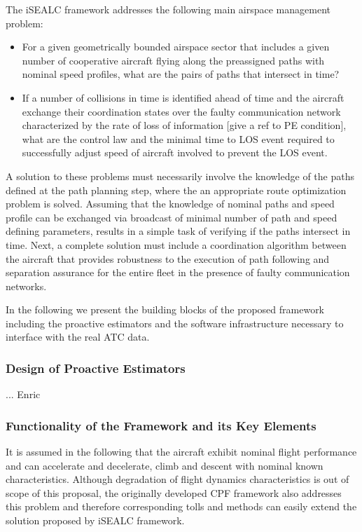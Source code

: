 \documentclass[letter,onecolumn,12pt]{aiaa-tc}
\newcommand{\1}{1_n}
\begin{document}
The iSEALC framework addresses the following main airspace management problem:
\vspace{-2mm}
\begin{itemize}
\setlength{\itemsep}{-4pt}
    \item For a given geometrically bounded airspace sector that includes a given number of cooperative aircraft flying along the preassigned paths with nominal speed profiles, what are the pairs of paths that intersect in time?

    \item If a number of collisions in time is identified ahead of time and the aircraft exchange their coordination states over the faulty communication network characterized by the rate of loss of information [give a ref to PE condition], what are the control law and the minimal time to LOS event required to successfully adjust speed of aircraft involved to prevent the LOS event.
\end{itemize}
\vspace{-2mm}

A solution to these problems must necessarily involve the knowledge of the paths defined at the path planning step, where the an appropriate route optimization  problem is solved. Assuming that the knowledge of nominal paths and speed profile can be exchanged via broadcast of minimal number of path and speed defining parameters, results in a simple task of verifying if the paths intersect in time. Next, a complete solution must include a coordination algorithm between the aircraft that provides robustness to the execution of path following and separation assurance for the entire fleet in the presence of faulty communication networks.

In the following we present the building blocks of the proposed framework including the proactive estimators and the software infrastructure necessary to interface with the real ATC data.

\subsubsection{Design of Proactive Estimators}
... Enric


\subsubsection{Functionality of the Framework and its Key Elements}
\label{subsubsec:functionality}
It is assumed in the following that the aircraft exhibit nominal flight performance and can accelerate and decelerate, climb and descent with nominal known characteristics.  Although degradation of flight dynamics characteristics is out of scope of this proposal, the originally developed CPF framework also addresses this problem and therefore corresponding tolls and methods can easily extend the solution proposed by iSEALC framework.
\end{document}
